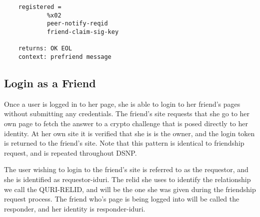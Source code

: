 \documentclass[letterpaper,11pt,oneside]{article}
\begin{document}
\vspace{10pt}
\begin{verbatim}
    registered = 
            %x02 
            peer-notify-reqid 
            friend-claim-sig-key

    returns: OK EOL
    context: prefriend message
\end{verbatim}


\subsection{Login as a Friend}

Once a user is logged in to her page, she is able to login to her friend's
pages without submitting any credentials. The friend's site requests that she
go to her own page to fetch the answer to a crypto challenge that is posed
directly to her identity. At her own site it is verified that she is is the
owner, and the login token is returned to the friend's site. Note that this
pattern is identical to friendship request, and is repeated throughout DSNP.

The user wishing to login to the friend's site is referred to as the requestor,
and she is identified as requestor-iduri. The relid she uses to identify the relationship
we call the QURI-RELID, and will be the one she was given during the friendship
request process. The friend who's page is being logged into will be called the
responder, and her identity is responder-iduri.
\end{document}
